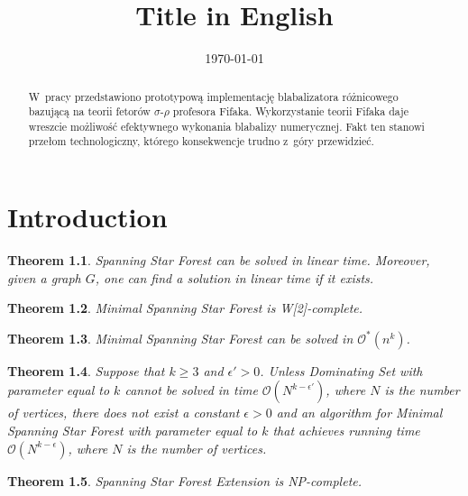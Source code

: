 \documentclass[en]{pracamgr}
\title{Title in English}
\date{\monthyeardate\today}
\newtheorem{theorem}{Theorem}
\newcommand{\ssfp}{{\sc Spanning Star Forest}}
\newcommand{\mssfp}{{\sc Minimal Spanning Star Forest}}
\newcommand{\ssfep}{{\sc Spanning Star Forest Extension}}
\newcommand{\domsetp}{{\sc Dominating Set}}
\begin{document}
\maketitle

\begin{abstract}
  W~pracy przedstawiono prototypową implementację blabalizatora
  różnicowego bazującą na teorii fetorów $\sigma$-$\rho$ profesora
  Fifaka.  Wykorzystanie teorii Fifaka daje wreszcie możliwość
  efektywnego wykonania blabalizy numerycznej.  Fakt ten stanowi
  przełom technologiczny, którego konsekwencje trudno z~góry
  przewidzieć.
\end{abstract}

\tableofcontents

\chapter{Introduction}

\begin{theorem}\label{thm-ssfp}
	\ssfp{} can be solved in linear time. Moreover, given a graph $G$, one can find a solution in linear time if it exists.
\end{theorem}

\begin{theorem}\label{thm-mssfp-w2c}
	\mssfp{} is \textup{W[2]}-complete.
\end{theorem}

\begin{theorem}\label{thm-mssfp-time}
	\mssfp{} can be solved in $\mathcal{O}^*(n^k)$.
\end{theorem}

\begin{theorem}\label{thm-mssfp-lowerbound}
	Suppose that $k \geq 3$ and $\epsilon' > 0$. Unless \domsetp{} with parameter equal to $k$ cannot be solved in time $\mathcal{O}(N^{k-\epsilon'})$, where $N$ is the number of vertices, there does not exist a constant $\epsilon >0$ and an algorithm for \mssfp{} with parameter equal to $k$ that achieves running time  $\mathcal{O}(N^{k-\epsilon})$, where $N$ is the number of vertices.
\end{theorem}

\begin{theorem}\label{thm-ssfep-npc}
	\ssfep{} is \textup{NP}-complete.
\end{theorem}
\end{document}
